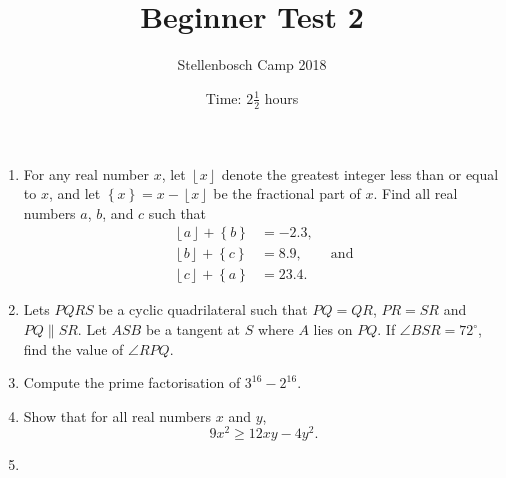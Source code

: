 \documentclass{article}
\title{Beginner Test 2}
\author{Stellenbosch Camp 2018}
\date{Time: $2\frac{1}{2}$ hours}
\newcommand{\floor}[1]{\ensuremath{\left\lfloor#1\right\rfloor}}
\newcommand{\fracpart}[1]{\ensuremath{\left\{#1\right\}}}
\begin{document}
\maketitle

\begin{enumerate}[1.]

\item %
For any real number $x$, let $\floor{x}$ denote the greatest integer less than or equal to $x$, and let $\fracpart{x} = x -\floor{x}$ be the fractional part of $x$. Find all real numbers $a$, $b$, and $c$ such that
\begin{align*}
  \floor{a} +\fracpart{b} &= -2.3, \\
  \floor{b} +\fracpart{c} &= 8.9, \qquad \mathrm{and}\\
  \floor{c} +\fracpart{a} &= 23.4.
\end{align*}


\vspace{12pt}
\item %
Lets $PQRS$ be a cyclic quadrilateral such that $PQ = QR$, $PR = SR$ and $PQ \parallel SR$. Let $ASB$ be a tangent at $S$ where $A$ lies on $PQ$. If $\angle BSR = 72^{\circ}$, find the value of $\angle RPQ$.


\vspace{12pt}
\item %
Compute the prime factorisation of $3^{16} -2^{16}$.


\vspace{12pt}
\item %
Show that for all real numbers $x$ and $y$, \[ 9x^2 \geq 12xy -4y^2. \]


\vspace{12pt}
\item %



\end{enumerate}


\vspace{12pt}
\begin{center}
\begin{BVerbatim}

\end{BVerbatim}
\end{center}
\end{document}
